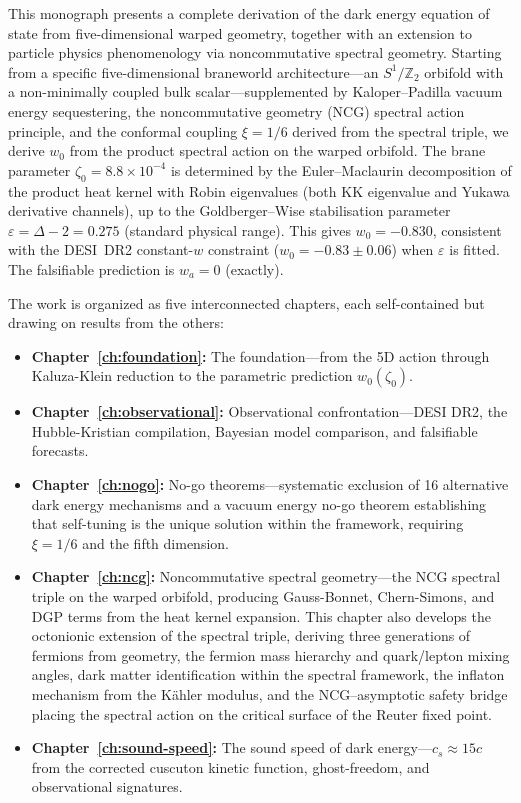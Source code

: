 This monograph presents a complete derivation of the dark energy equation of state from five-dimensional warped geometry, together with an extension to particle physics phenomenology via noncommutative spectral geometry. Starting from a specific five-dimensional braneworld architecture---an $S^1/\mathbb{Z}_2$ orbifold with a non-minimally coupled bulk scalar---supplemented by Kaloper--Padilla vacuum energy sequestering, the noncommutative geometry (NCG) spectral action principle, and the conformal coupling $\xi = 1/6$ derived from the spectral triple, we derive $w_0$ from the product spectral action on the warped orbifold.  The brane parameter $\zeta_0 = 8.8 \times 10^{-4}$ is determined by the Euler--Maclaurin decomposition of the product heat kernel with Robin eigenvalues (both KK eigenvalue and Yukawa derivative channels), up to the Goldberger--Wise stabilisation parameter $\varepsilon = \Delta - 2 = 0.275$ (standard physical range).  This gives $w_0 = -0.830$, consistent with the DESI~DR2 constant-$w$ constraint ($w_0 = -0.83 \pm 0.06$) when $\varepsilon$ is fitted.  The falsifiable prediction is $w_a = 0$ (exactly).

The work is organized as five interconnected chapters, each self-contained but drawing on results from the others:

\begin{itemize}
\item \textbf{Chapter~\ref{ch:foundation}:} The foundation---from the 5D action through Kaluza-Klein reduction to the parametric prediction $w_0(\zeta_0)$.
\item \textbf{Chapter~\ref{ch:observational}:} Observational confrontation---DESI DR2, the Hubble-Kristian compilation, Bayesian model comparison, and falsifiable forecasts.
\item \textbf{Chapter~\ref{ch:nogo}:} No-go theorems---systematic exclusion of 16 alternative dark energy mechanisms and a vacuum energy no-go theorem establishing that self-tuning is the unique solution within the framework, requiring $\xi = 1/6$ and the fifth dimension.
\item \textbf{Chapter~\ref{ch:ncg}:} Noncommutative spectral geometry---the NCG spectral triple on the warped orbifold, producing Gauss-Bonnet, Chern-Simons, and DGP terms from the heat kernel expansion. This chapter also develops the octonionic extension of the spectral triple, deriving three generations of fermions from geometry, the fermion mass hierarchy and quark/lepton mixing angles, dark matter identification within the spectral framework, the inflaton mechanism from the K\"ahler modulus, and the NCG--asymptotic safety bridge placing the spectral action on the critical surface of the Reuter fixed point.
\item \textbf{Chapter~\ref{ch:sound-speed}:} The sound speed of dark energy---$c_s \approx 15c$ from the corrected cuscuton kinetic function, ghost-freedom, and observational signatures.
\end{itemize}

